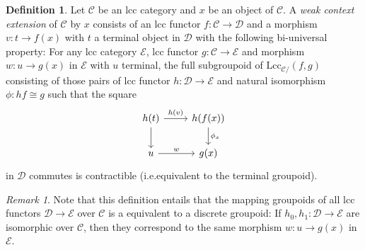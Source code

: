 \documentclass[a4paper]{article}
\theoremstyle{remark}
\newtheorem{remark}[theorem]{Remark}
\theoremstyle{definition}
\newtheorem{definition}[theorem]{Definition}
\begin{document}
\begin{definition}
  \label{def:weak-ext}
  Let $\mathcal{C}$ be an lcc category and $x$ be an object of $\mathcal{C}$.
  A \emph{weak context extension} of $\mathcal{C}$ by $x$ consists of an lcc functor $f : \mathcal{C} \rightarrow \mathcal{D}$ and a morphism $v : t \rightarrow f(x)$ with $t$ a terminal object in $\mathcal{D}$ with the following bi-universal property:
  For any lcc category $\mathcal{E}$, lcc functor $g : \mathcal{C} \rightarrow \mathcal{E}$ and morphism $w : u \rightarrow g(x)$ in $\mathcal{E}$ with $u$ terminal, the full subgroupoid of $\mathrm{Lcc}_{\mathcal{C} /}(f, g)$ consisting of those pairs of lcc functor $h : \mathcal{D} \rightarrow \mathcal{E}$ and natural isomorphism $\phi : hf \cong g$ such that the square
  \begin{equation}
    \begin{tikzcd}
      h(t) \arrow[d] \arrow[r, "h(v)"] & h(f(x)) \arrow[d, "\phi_x"] \\
      u \arrow[r, "w"] & g(x)
    \end{tikzcd}
  \end{equation}
  in $\mathcal{D}$ commutes is contractible (i.e.\@ equivalent to the terminal groupoid).
\end{definition}

\begin{remark}
  \label{rem:discrete-weak-ext-mapping}
Note that this definition entails that the mapping groupoids of all lcc functors $\mathcal{D} \rightarrow \mathcal{E}$ over $\mathcal{C}$ is a equivalent to a discrete groupoid:
If $h_0, h_1 : \mathcal{D} \rightarrow \mathcal{E}$ are isomorphic over $\mathcal{C}$, then they correspond to the same morphism $w : u \rightarrow g(x)$ in $\mathcal{E}$.
\end{remark}
\end{document}
